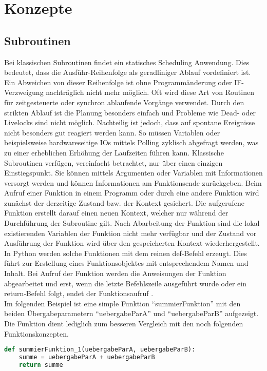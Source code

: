 \chapter{Konzepte}
\label{ch:concept}
\section{Subroutinen}
Bei klassischen Subroutinen findet ein statisches Scheduling Anwendung. Dies bedeutet, dass die Ausführ-Reihenfolge als geradliniger Ablauf vordefiniert ist. Ein Abweichen von dieser Reihenfolge ist ohne Programmänderung oder IF-Verzweigung nachträglich nicht mehr möglich. Oft wird diese Art von Routinen für zeitgesteuerte oder synchron ablaufende Vorgänge verwendet. Durch den strikten Ablauf ist die Planung besonders einfach und Probleme wie Dead- oder Livelocks sind nicht möglich. Nachteilig ist jedoch, dass auf spontane Ereignisse nicht besonders gut reagiert werden kann. So müssen Variablen oder beispielsweise hardwareseitige IOs mittels Polling zyklisch abgefragt werden, was zu einer erheblichen Erhöhung der Laufzeiten führen kann\cite[S.~4-6]{Prof.Dr.Ing.JurgenKrumm.2021}.
Klassische Subroutinen verfügen, vereinfacht betrachtet, nur über einen einzigen Einstiegspunkt. Sie können mittels Argumenten oder Variablen mit Informationen versorgt werden und können Informationen am Funktionsende zurückgeben. Beim Aufruf einer Funktion in einem Programm oder durch eine andere Funktion wird zunächst der derzeitige Zustand bzw. der Kontext gesichert. Die aufgerufene Funktion erstellt darauf einen neuen Kontext, welcher nur während der Durchführung der Subroutine gilt. Nach Abarbeitung der Funktion sind die lokal existierenden Variablen der Funktion nicht mehr verfügbar und der Zustand vor Ausführung der Funktion wird über den gespeicherten Kontext wiederhergestellt.\\
In Python werden solche Funktionen mit dem reinen def-Befehl erzeugt. Dies führt zur Erstellung eines Funktionsobjektes mit entsprechendem Namen und Inhalt. Bei Aufruf der Funktion werden die Anweisungen der Funktion abgearbeitet und erst, wenn die letzte Befehlszeile ausgeführt wurde oder ein return-Befehl folgt, endet der Funktionsaufruf \cite[S.~113-116]{Prof.Dr.Ing.JurgenKrumm.2021b}.\\
Im folgenden Beispiel ist eine simple Funktion ``summierFunktion'' mit den beiden Übergabeparametern ``uebergabeParA'' und ``uebergabeParB'' aufgezeigt. Die Funktion dient lediglich zum besseren Vergleich mit den noch folgenden Funktionskonzepten.\\
\begin{lstlisting}[language=Python,caption={Beispiel f"ur Funktionsdefinition als Subroutine},captionpos=b]
def summierFunktion_1(uebergabeParA, uebergabeParB):
    summe = uebergabeParA + uebergabeParB    
    return summe
\end{lstlisting}

